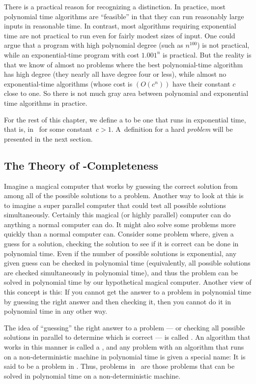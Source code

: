 There is a practical reason for recognizing a distinction.
In practice, most polynomial time algorithms are ``feasible'' in that
they can run reasonably large inputs in reasonable time.
In contrast, most algorithms requiring exponential time are not
practical to run even for fairly modest sizes of input.
One could argue that a program with high polynomial degree
(such as \(n^{100}\)) is not practical, while an exponential-time
program with cost \(1.001^n\) is practical.
But the reality is that we know of almost no problems where the best
polynomial-time algorithm has high degree (they nearly all have
degree four or less), while almost no exponential-time algorithms
(whose cost is \((O(c^n))\) have their constant \(c\) close to one.
So there is not much gray area between polynomial and
exponential time algorithms in practice.

For the rest of this chapter, we define a  to
be one that runs in exponential time, that is, in \Omegacn\ for some
constant~\(c > 1\).
A~definition for a hard \emph{problem} will be presented in the next
section.

\subsection {The Theory of \NP-Completeness}
\label{NPTheory}

Imagine a magical computer that works by guessing the correct
solution from among all of the possible solutions to a problem.
Another way to look at this is to imagine a super parallel computer
that could test all possible solutions simultaneously.
Certainly this magical (or highly parallel) computer can do anything a
normal computer can do.
It might also solve some problems more quickly than a normal computer
can.
Consider some problem where, given a guess for a solution, checking
the solution to see if it is correct can be done in polynomial time.
Even if the number of possible solutions is exponential,
any given guess can be checked in polynomial time (equivalently, all
possible solutions are checked simultaneously in polynomial time),
and thus the problem can be solved in polynomial time by our
hypothetical magical computer.
Another view of this concept is this: If you cannot get the answer
to a problem in polynomial time by guessing the right answer and then
checking it, then you cannot do it in polynomial time in any other way.

The idea of ``guessing'' the right answer to a problem --- or checking
all possible solutions in parallel to determine which is correct ---
is called .
An algorithm that works in this manner is called a
,
and any problem with an algorithm that runs on a non-deterministic
machine in polynomial time is given a special name:
It is said to be a problem in \NP.
Thus, problems in \NP\ are those problems that can be solved
in polynomial time on a non-deterministic machine.

